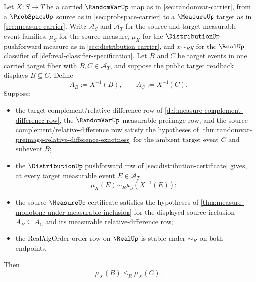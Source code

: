 \begin{theorem}
\label{thm:distribution-pushforward-monotone-under-target-inclusion}
Let $X:S\to T$ be a carried $\RandomVarUp$ map as in \autoref{sec:randomvar-carrier}, from a $\ProbSpaceUp$ source as in \autoref{sec:probspace-carrier} to a $\MeasureUp$ target as in \autoref{sec:measure-carrier}. Write $\mathcal{A}_S$ and $\mathcal{A}_T$ for the source and target measurable-event families, $\mu_S$ for the source measure, $\mu_X$ for the $\DistributionUp$ pushforward measure as in \autoref{sec:distribution-carrier}, and $x\sim_R y$ for the $\RealUp$ classifier of \autoref{def:real-classifier-specification}. Let $B$ and $C$ be target events in one carried target fiber with $B,C\in\mathcal{A}_T$, and suppose the public target readback displays $B\subseteq C$. Define
$$
A_B:=X^{-1}(B),\qquad A_C:=X^{-1}(C).
$$
Suppose:
\begin{itemize}
\item the target complement/relative-difference row of \autoref{def:measure-complement-difference-row}, the $\RandomVarUp$ measurable-preimage row, and the source complement/relative-difference row satisfy the hypotheses of \autoref{thm:randomvar-preimage-relative-difference-exactness} for the ambient target event $C$ and subevent $B$;
\item the $\DistributionUp$ pushforward row of \autoref{sec:distribution-certificate} gives, at every target measurable event $E\in\mathcal{A}_T$,
$$
\mu_X(E)\sim_R\mu_S(X^{-1}(E));
$$
\item the source $\MeasureUp$ certificate satisfies the hypotheses of \autoref{thm:measure-monotone-under-measurable-inclusion} for the displayed source inclusion $A_B\subseteq A_C$ and its measurable relative-difference row;
\item the RealAlgOrder order row on $\RealUp$ is stable under $\sim_R$ on both endpoints.
\end{itemize}
Then
$$
\mu_X(B)\le_R\mu_X(C).
$$
\end{theorem}
